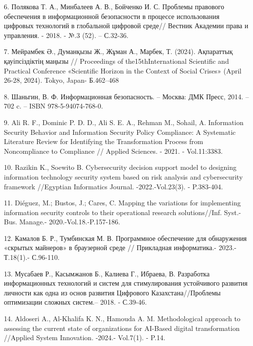 6. Полякова Т. А., Минбалеев А. В., Бойченко И. С. Проблемы правового
обеспечения в информационной безопасности в процессе использования
цифровых технологий в глобальной цифровой среде// Вестник Академии права
и управления. - 2018. - №.3 (52). -- С.32-36.

7. Мейрамбек Ә., Думанқызы Ж., Жұман А., Марбек, Т. (2024). Ақпараттық
қауіпсіздіктің маңызы // Proceedings of the15thInternational Scientific
and Practical Conference «Scientific Horizon in the Context of Social
Crises» (April 26-28, 2024). Tokyo, Japan- Б.462--468

\href{https://doi.org/10.3390/app1108333}{}

8. Шаньгин, В. Ф. Информационная безопасность. -- Москва: ДМК Пресс,
2014. -- 702 c. -- ISBN 978-5-94074-768-0.

9. Ali R. F., Dominic P. D. D., Ali S. E. A., Rehman M., Sohail, A.
Information Security Behavior and Information Security Policy
Compliance: A Systematic Literature Review for Identifying the
Transformation Process from Noncompliance to Compliance // Applied
Sciences. - 2021. - Vol.11:3383.
\href{https://doi.org/10.3390/app11083383}{}

10. Razikin K., Soewito B. Cybersecurity decision support model to
designing information technology security system based on risk analysis
and cybersecurity framework //Egyptian Informatics Journal.
-2022.-Vol.23(3). - P.383-404.
\href{https://doi.org/10.1016/j.eij.2022.03.001}{}

11. Diéguez, M.; Bustos, J.; Cares, C. Mapping the variations for
implementing information security controls to their operational research
solutions//Inf. Syst.-Bus. Manage.- 2020.-Vol.18.-P.157-186.
~\href{https://doi.org/10.1007/s10257-020-00470-8}{}

12. Камалов Б. Р., Тумбинская М. В. Программное обеспечение для
обнаружения «скрытых майнеров» в браузерной среде // Прикладная
информатика.- 2023.-Т.18(1).- С.96-110.
\href{\%20https:/doi.org/10.37791/2687-0649-2023-18-1-96-110}{}

13. Мусабаев Р., Касымжанов Б., Калиева Г., Ибраева, В. Разработка
информационных технологий и систем для стимулирования устойчивого
развития личности как одна из основ развития Цифрового
Казахстана//Проблемы оптимизации сложных систем.-- 2018. - С.39-46.

14. Aldoseri A., Al-Khalifa K. N., Hamouda A. M. Methodological approach
to assessing the current state of organizations for AI-Based digital
transformation //Applied System Innovation. -2024.- Vol.7(1). - P.14.
\href{https://doi.org/10.3390/asi7010014}{}

